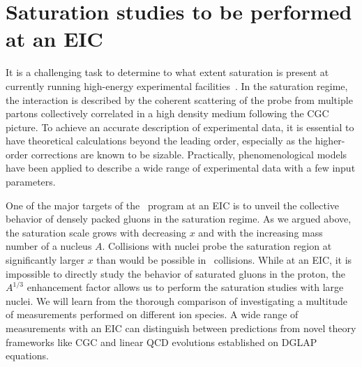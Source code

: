 %


\section{Saturation studies to be performed at an EIC} \label{sec:eic_eA_physics}

It is a challenging task to determine to what extent saturation is present at
currently running high-energy experimental facilities~\cite{Albacete:2010rh}. In
the saturation regime, the interaction is described by the coherent scattering
of the probe from multiple partons collectively correlated in a high density
medium following the CGC picture. To achieve an accurate description of
experimental data, it is essential to have theoretical calculations beyond
the leading order, especially as the higher-order corrections are known to be
sizable. Practically, phenomenological models have been applied to describe a
wide range of experimental data with a few input parameters.

One of the major targets of the \eA\ program at an EIC is to unveil the
collective behavior of densely packed gluons in the saturation regime. As we
argued above, the saturation scale grows with decreasing $x$ and with the
increasing mass number of a nucleus $A$. Collisions with nuclei probe the
saturation region at significantly larger $x$ than would be possible in \ep\
collisions. While at an EIC, it is impossible to directly study the behavior of
saturated gluons in the proton, the $A^{1/3}$ enhancement factor allows us to
perform the saturation studies with large nuclei. We will learn from the
thorough comparison of investigating a multitude of measurements performed on
different ion species. A wide range of measurements with an EIC can distinguish
between predictions from novel theory frameworks like CGC and linear QCD
evolutions established on DGLAP equations.

